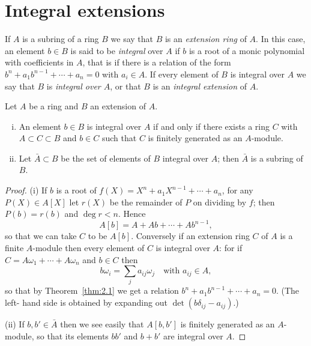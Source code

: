 \section{Integral extensions}\label{sec:9}

If $A$ is a subring of a ring $B$ we say that $B$ is an \emph{extension ring} of $A$.
In this case, an element $b \in B$ is said to be \emph{integral} over $A$ if $b$ is a root of
a monic polynomial with coefficients in $A$, that is if there is a relation of the
form $b^n + a_1b^{n-1} + \cdots + a_n = 0$ with $a_i \in A$. If every element of $B$ is integral
over $A$ we say that $B$ is \emph{integral over $A$}, or that $B$ is an \emph{integral extension} of $A$.

\begin{theorem}\label{thm:9.1}
Let $A$ be a ring and $B$ an extension of $A$.
\begin{enumerate}[(i)]
  \item An element $b \in B$ is integral over $A$ if and only if there exists a ring $C$
        with $A \subset C \subset B$ and $b \in C$ such that $C$ is finitely generated as an $A$-module.
  \item Let $\bar{A} \subset B$ be the set of elements of $B$ integral over $A$; then $\bar{A}$ is
        a subring of $B$.
\end{enumerate}
\end{theorem}

\begin{proof}
(i) If $b$ is a root of $f(X) = X^n + a_1X^{n-1} + \cdots + a_n$, for any $P(X) \in
A[X]$ let $r(X)$ be the remainder of $P$ on dividing by $f$; then $P(b) = r(b)$
and $\deg r < n$. Hence
\[
  A[b] = A + Ab + \cdots + Ab^{n-1},
\]
so that we can take $C$ to be $A[b]$. Conversely if an extension ring $C$ of $A$ is a
finite $A$-module then every element of $C$ is integral over $A$: for if $C = A\omega_1
+ \cdots + A\omega_n$ and $b \in C$ then
\[
  b\omega_i = \sum_j a_{ij}\omega_j \quad \text{with } a_{ij} \in A,
\]
so that by Theorem~\ref{thm:2.1} we get a relation $b^n + a_1b^{n-1} + \cdots + a_n = 0$. (The left-
hand side is obtained by expanding out $\det(b\delta_{ij} - a_{ij})$.)

(ii) If $b, b' \in \bar{A}$ then we see easily that $A[b, b']$ is finitely generated as an $A$-
module, so that its elements $bb'$ and $b + b'$ are integral over $A$.
\end{proof}

